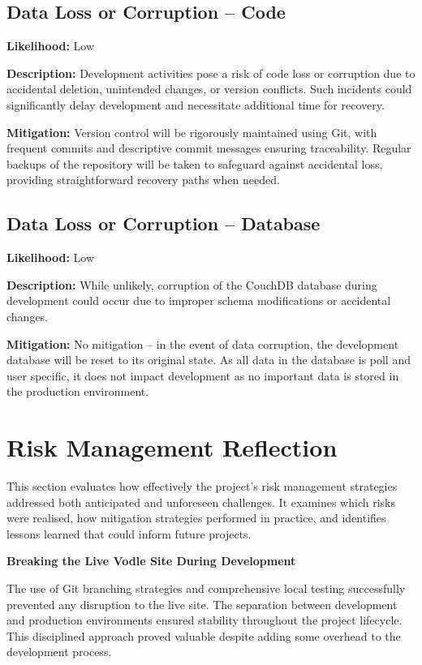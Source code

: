 \subsection*{Data Loss or Corruption -- Code}

\textbf{Likelihood:} Low

\textbf{Description:} Development activities pose a risk of code loss or corruption due to accidental deletion, unintended changes, or version conflicts. Such incidents could significantly delay development and necessitate additional time for recovery.

\textbf{Mitigation:} Version control will be rigorously maintained using Git, with frequent commits and descriptive commit messages ensuring traceability. Regular backups of the repository will be taken to safeguard against accidental loss, providing straightforward recovery paths when needed.

\subsection*{Data Loss or Corruption -- Database}

\textbf{Likelihood:} Low

\textbf{Description:} While unlikely, corruption of the CouchDB database during development could occur due to improper schema modifications or accidental changes.

\textbf{Mitigation:} No mitigation -- in the event of data corruption, the development database will be reset to its original state. As all data in the database is poll and user specific, it does not impact development as no important data is stored in the production environment.

\section{Risk Management Reflection}
This section evaluates how effectively the project's risk management strategies addressed both anticipated and unforeseen challenges. It examines which risks were realised, how mitigation strategies performed in practice, and identifies lessons learned that could inform future projects. 

\textbf{Breaking the Live Vodle Site During Development}

The use of Git branching strategies and comprehensive local testing successfully prevented any disruption to the live site. The separation between development and production environments ensured stability throughout the project lifecycle. This disciplined approach proved valuable despite adding some overhead to the development process.

